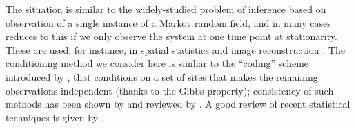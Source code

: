 \documentclass{article}
\theoremstyle{plain}
\theoremstyle{definition}
\begin{document}

The situation is similar to the widely-studied problem of inference based on observation
of a single instance of a Markov random field,
and in many cases reduces to this if we only observe the system at one time point at stationarity.
These are used, for instance, in spatial statistics \citep{besag1972nearestneighbour,gelfand2010handbook}
and image reconstruction \citep{geman1984stochastic,besag1986statistical}.
The conditioning method we consider here
is simliar to the ``coding'' scheme introduced by \citet{besag1974spatial},
that conditions on a set of sites that makes the remaining observations independent (thanks to the Gibbs property);
consistency of such methods has been shown by \citet{comets1992consistency} and reviewed by \citet{larribe2011composite}.
A good review of recent statistical techniques is given by \citet{friel2012bayesian}.
\end{document}
